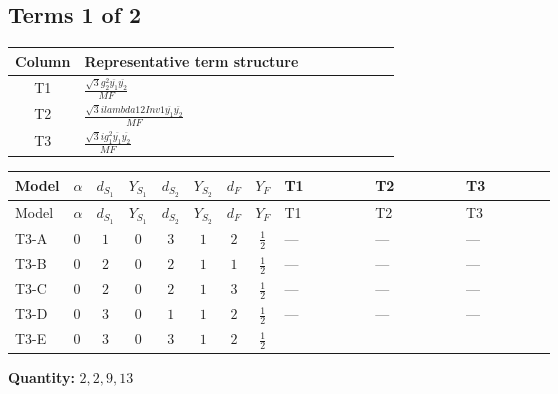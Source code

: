\documentclass[8pt]{article}
\begin{document}
\begin{landscape}
\subsection*{Terms 1 of 2}
\begin{center}
\begin{tabular}{@{}c >{\raggedright\arraybackslash}p{0.82\linewidth}@{}}
\toprule
Column & Representative term structure \\
\midrule
T1 & \(\displaystyle \frac{\sqrt{3} g_{2}^{2} \overline{y_{1}} \overline{y_{2}}}{MF}\) \\
\midrule
T2 & \(\displaystyle \frac{\sqrt{3} i lambda12Inv1 \overline{y_{1}} \overline{y_{2}}}{MF}\) \\
\midrule
T3 & \(\displaystyle \frac{\sqrt{3} i g_{1}^{2} \overline{y_{1}} \overline{y_{2}}}{MF}\) \\
\midrule
\bottomrule
\end{tabular}
\end{center}
\smallskip
\tiny
\begin{longtable}{@{}llcccccc >{\raggedright\arraybackslash}p{0.21\linewidth} >{\raggedright\arraybackslash}p{0.21\linewidth} >{\raggedright\arraybackslash}p{0.21\linewidth}@{}}
\toprule
Model & $\alpha$ & $d_{S_1}$ & $Y_{S_1}$ & $d_{S_2}$ & $Y_{S_2}$ & $d_F$ & $Y_F$ & T1 & T2 & T3 \\
\midrule
\endfirsthead
\toprule
Model & $\alpha$ & $d_{S_1}$ & $Y_{S_1}$ & $d_{S_2}$ & $Y_{S_2}$ & $d_F$ & $Y_F$ & T1 & T2 & T3 \\
\midrule
\endhead
T3-A & $0$ & $1$ & $0$ & $3$ & $1$ & $2$ & $\frac{1}{2}$ & --- & --- & --- \\
\midrule
T3-B & $0$ & $2$ & $0$ & $2$ & $1$ & $1$ & $\frac{1}{2}$ & --- & --- & --- \\
\midrule
T3-C & $0$ & $2$ & $0$ & $2$ & $1$ & $3$ & $\frac{1}{2}$ & --- & --- & --- \\
\midrule
T3-D & $0$ & $3$ & $0$ & $1$ & $1$ & $2$ & $\frac{1}{2}$ & --- & --- & --- \\
\midrule
T3-E & $0$ & $3$ & $0$ & $3$ & $1$ & $2$ & $\frac{1}{2}$ & \scriptsize\adjustbox{max width=\linewidth}{$\begin{gathered} - \frac{\sqrt{3} g_{2}^{2} \overline{y_{1}} \overline{y_{2}}}{6 MF}\end{gathered}$} & \scriptsize\adjustbox{max width=\linewidth}{$\begin{gathered} - \frac{\sqrt{3} i lambda12Inv1 \overline{y_{1}} \overline{y_{2}}}{6 MF}\end{gathered}$} & \scriptsize\adjustbox{max width=\linewidth}{$\begin{gathered} \frac{\sqrt{3} i g_{1}^{2} \overline{y_{1}} \overline{y_{2}}}{8 MF}\end{gathered}$} \\
\midrule
\bottomrule
\end{longtable}
\clearpage
\noindent\textbf{Quantity: }$\mathrm{2,2,9,13}$\par\smallskip

\end{landscape}
\end{document}
